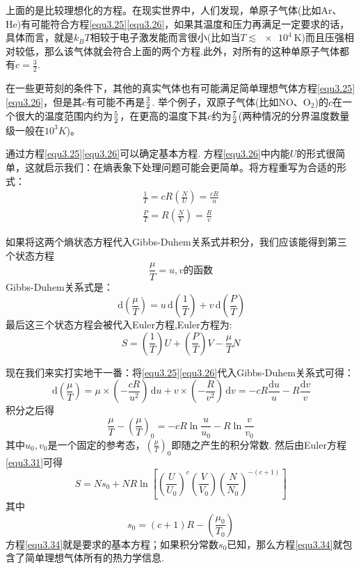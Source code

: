 上面的是比较理想化的方程。在现实世界中，人们发现，单原子气体(比如Ar、He)有可能符合方程\eqref{equ3.25}\eqref{equ3.26}，如果其温度和压力再满足一定要求的话，具体而言，就是$k_BT$相较于电子激发能而言很小(比如当$T\lesssim \SI{e4}{\kelvin}$)而且压强相对较低，那么该气体就会符合上面的两个方程.此外，对所有的这种单原子气体都有$c=\frac{3}{2}$.

在一些更苛刻的条件下，其他的真实气体也有可能满足简单理想气体方程\eqref{equ3.25}\eqref{equ3.26}，但是其$c$有可能不再是$3\over2$. 举个例子，双原子气体(比如NO、O$_2$)的$c$在一个很大的温度范围内约为${5\over2}$，在更高的温度下其$c$约为$7\over2$(两种情况的分界温度数量级一般在$10^3K$)。

通过方程\eqref{equ3.25}\eqref{equ3.26}可以确定基本方程. 方程\eqref{equ3.26}中内能$U$的形式很简单，这就启示我们：在熵表象下处理问题可能会更简单。将方程重写为合适的形式：
\begin{align}
\frac{1}{T}=cR\left(\frac{N}{U}\right)=\frac{cR}{u}\label{equ3.27}\\
\frac{P}{T}=R\left(\frac{N}{V}\right)=\frac{R}{v}\label{equ3.28}
\end{align}

如果将这两个熵状态方程代入Gibbs-Duhem关系式并积分，我们应该能得到第三个状态方程
\begin{equation}
\label{equ3.29}
\frac{\mu}{T}=u,v\text{的函数}
\end{equation}
Gibbs-Duhem关系式是：
\begin{equation}
\label{equ3.30}
\,\text{d}\left(\frac{\mu}{T}\right)=u\,\text{d}\left(\frac{1}{T}\right)+v\,\text{d}\left(\frac{P}{T}\right)
\end{equation}
最后这三个状态方程会被代入Euler方程,Euler方程为:
\begin{equation}
\label{equ3.31}
S=(\frac{1}{T})U+(\frac{P}{T})V-\frac{\mu}{T}N
\end{equation}

现在我们来实打实地干一番：将\eqref{equ3.25}\eqref{equ3.26}代入Gibbs-Duhem关系式可得：
\begin{equation}
\label{equ3.32}
\,\text{d}\left(\frac{\mu}{T}\right)=\mu\times\left(-\frac{cR}{u^2}\right)\,\text{d}u+v\times\left(-\frac{R}{v^2}\right)\,\text{d}v=-cR\frac{\text{d}u}{u}-R\frac{\text{d}v}{v}
\end{equation}
积分之后得
\begin{equation}
\label{equ3.33}
\frac{\mu}{T}-(\frac{\mu}{T})_0=-cR\ln{\frac{u}{u_0}}-R\ln{\frac{v}{v_0}}
\end{equation}
其中$u_0,v_0$是一个固定的参考态，$(\frac{\mu}{T})_0$即随之产生的积分常数. 然后由Euler方程\eqref{equ3.31}可得
\begin{equation}
\label{equ3.34}
S=Ns_0+NR\ln\left[\left(\frac{U}{U_0}\right)^c\left(\frac{V}{V_0}\right)\left(\frac{N}{N_0}\right)^{-(c+1)}\right]
\end{equation}
其中
\begin{equation}
\label{equ3.35}
s_0=(c+1)R-\left(\frac{\mu_0}{T_0}\right)
\end{equation}
方程\eqref{equ3.34}就是要求的基本方程；如果积分常数$s_0$已知，那么方程\eqref{equ3.34}就包含了简单理想气体所有的热力学信息.

